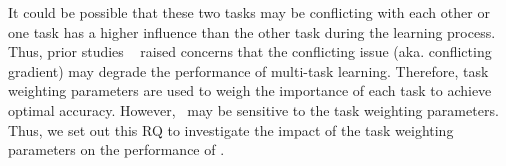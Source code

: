 \begin{description}
    It could be possible that these two tasks may be conflicting with each other or one task has a higher influence than the other task during the learning process. 
    Thus, prior studies ~\cite{vandenhende2021multi,sener2018multi} raised concerns that the conflicting issue (aka. conflicting gradient) may degrade the performance of multi-task learning.
    Therefore, task weighting parameters are used to weigh the importance of each task to achieve optimal accuracy.
    However, \our~may be sensitive to the task weighting parameters.
    Thus, we set out this RQ to investigate the impact of the task weighting parameters on the performance of \our.
    
    
    
    
    
    

    
    

    
    

\end{description}
